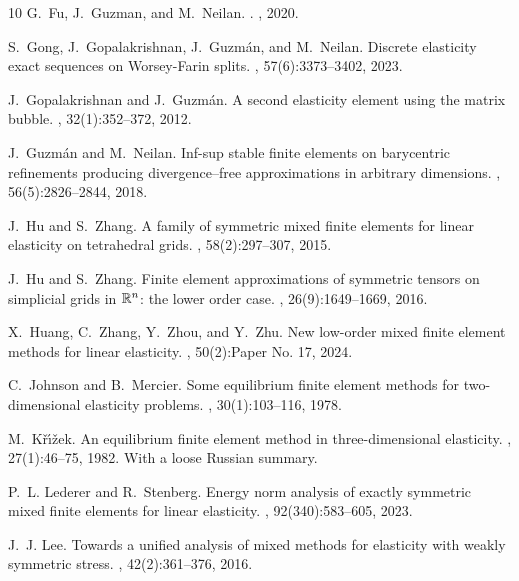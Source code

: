 \documentclass[12pt]{amsart}
\numberwithin{equation}{section}
\theoremstyle{definition}
\theoremstyle{remark}
\renewcommand{\(}{\bigl(}
\renewcommand{\)}{\bigr)}
\begin{document}
\begin{thebibliography}{10}
G.~Fu, J.~Guzman, and M.~Neilan.
.
, 2020.

S.~Gong, J.~Gopalakrishnan, J.~Guzm\'{a}n, and M.~Neilan.
\newblock Discrete elasticity exact sequences on {W}orsey-{F}arin splits.
, 57(6):3373--3402, 2023.

J.~Gopalakrishnan and J.~Guzm{\'a}n.
\newblock A second elasticity element using the matrix bubble.
, 32(1):352--372, 2012.

J.~Guzm{\'a}n and M.~Neilan.
\newblock Inf-sup stable finite elements on barycentric refinements producing
  divergence--free approximations in arbitrary dimensions.
, 56(5):2826--2844, 2018.

J.~Hu and S.~Zhang.
\newblock A family of symmetric mixed finite elements for linear elasticity on
  tetrahedral grids.
, 58(2):297--307, 2015.

J.~Hu and S.~Zhang.
\newblock Finite element approximations of symmetric tensors on simplicial
  grids in {$\Bbb{R}^n$}: the lower order case.
, 26(9):1649--1669, 2016.

X.~Huang, C.~Zhang, Y.~Zhou, and Y.~Zhu.
\newblock New low-order mixed finite element methods for linear elasticity.
, 50(2):Paper No. 17, 2024.

C.~Johnson and B.~Mercier.
\newblock Some equilibrium finite element methods for two-dimensional
  elasticity problems.
, 30(1):103--116, 1978.

M.~K\v{r}\'{\i}\v{z}ek.
\newblock An equilibrium finite element method in three-dimensional elasticity.
, 27(1):46--75, 1982.
\newblock With a loose Russian summary.

P.~L. Lederer and R.~Stenberg.
\newblock Energy norm analysis of exactly symmetric mixed finite elements for
  linear elasticity.
, 92(340):583--605, 2023.

J.~J. Lee.
\newblock Towards a unified analysis of mixed methods for elasticity with
  weakly symmetric stress.
, 42(2):361--376, 2016.


\end{thebibliography}
\end{document}
